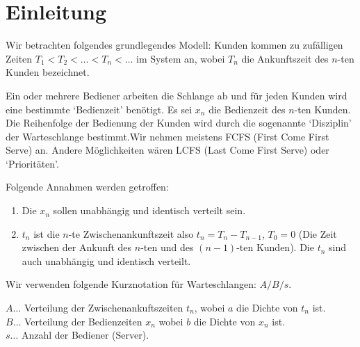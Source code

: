 \chapter{Einleitung}
Wir betrachten folgendes grundlegendes Modell:  Kunden kommen zu
zufälligen Zeiten  $T_{1} < T_{2} < \dots <T_{n} < \dots$ im System an,
wobei $T_{n}$
die Ankunftszeit des $n$-ten Kunden bezeichnet.

Ein oder mehrere Bediener arbeiten die Schlange ab und für jeden Kunden
wird eine bestimmte `Bedienzeit' benötigt. Es sei $x_{n}$ die Bedienzeit
des $n$-ten Kunden.
Die Reihenfolge der Bedienung der Kunden wird durch
die sogenannte `Disziplin' der Warteschlange bestimmt.Wir nehmen meistens
FCFS (First Come First Serve) an. Andere Möglichkeiten wären LCFS (Last
Come First Serve) oder `Prioritäten'.

Folgende Annahmen werden getroffen:
\begin{enumerate}
\item Die $x_{n}$ sollen unabhängig und identisch verteilt sein.
\item $t_{n}$ ist die $n$-te Zwischenankunftszeit also $t_{n}= T_{n} -
T_{n-1}$,  $T_{0}=0$ (Die Zeit zwischen der Ankunft des $n$-ten und des
$(n-1)$-ten Kunden). Die $t_{n}$ sind auch unabhängig und identisch
verteilt.
\end{enumerate}
Wir verwenden folgende Kurznotation für
Warteschlangen: $A/B/s$.

$A \dots$ Verteilung der Zwischenankuftszeiten $t_{n}$, wobei $a$ die Dichte
von $t_{n}$ ist. \\
$B \dots$ Verteilung der Bedienzeiten $x_{n}$ wobei $b$ die Dichte von
$x_{n}$ ist. \\
$s \dots$ Anzahl der Bediener (Server).

